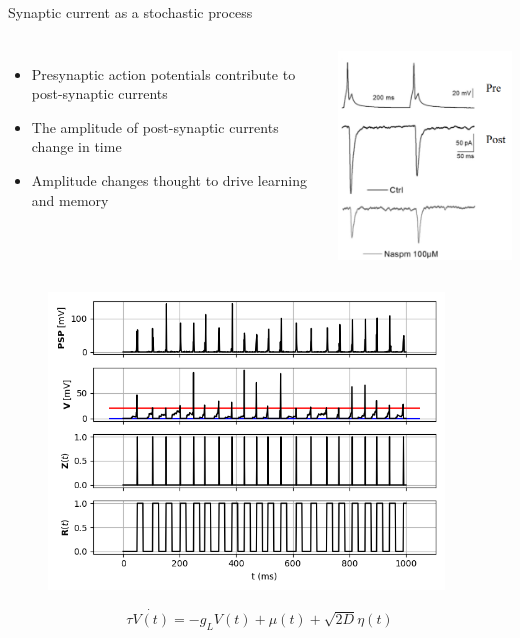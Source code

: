 \documentclass[aspectratio=169]{beamer}
\begin{document}
\begin{frame}{Synaptic current as a stochastic process}

\begin{columns}
\begin{itemize}
\item Presynaptic action potentials contribute to post-synaptic currents
\item The amplitude of post-synaptic currents change in time 
\item Amplitude changes thought to drive learning and memory
\end{itemize}

\centering
\includegraphics[width=65mm]{figure-3}
\end{columns}

\begin{figure}
\centering
\includegraphics[width=105mm]{figure-4}
\end{figure}

\begin{equation*}
\tau\dot{V(t)} = -g_{L}V(t) + \mu(t) + \sqrt{2D}\eta(t)
\end{equation*}

\end{frame}
\end{document}
